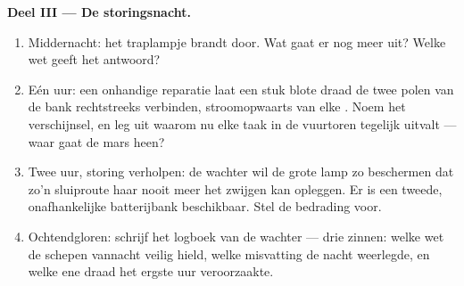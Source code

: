 \begin{problem}
\medskip\noindent\textbf{Deel III --- De storingsnacht.}
\begin{enumerate}[resume]
  \item Middernacht: het traplampje brandt door. Wat gaat er nog
        meer uit? Welke wet geeft het antwoord?
  \item Eén uur: een onhandige reparatie laat een stuk blote draad de
        twee polen van de bank rechtstreeks verbinden,
        stroomopwaarts van elke . Noem het verschijnsel, en leg
        uit waarom nu elke taak in de vuurtoren tegelijk uitvalt ---
        waar gaat de mars heen?
  \item Twee uur, storing verholpen: de wachter wil de grote lamp
        zo beschermen dat zo'n sluiproute haar nooit meer het zwijgen
        kan opleggen. Er is een tweede, onafhankelijke
        batterijbank beschikbaar. Stel de bedrading voor.
  \item Ochtendgloren: schrijf het logboek van de wachter --- drie
        zinnen: welke wet de schepen vannacht veilig hield, welke
        misvatting de nacht weerlegde, en welke ene draad het ergste
        uur veroorzaakte.
\end{enumerate}
\end{problem}
